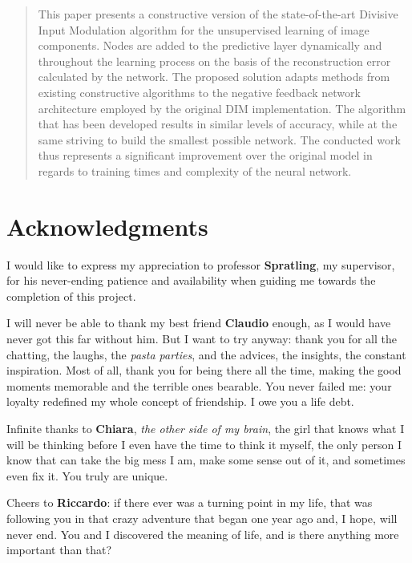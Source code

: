 \documentclass[11pt,a4paper]{report}
\begin{document}
	
	
	
	\begin{abstract}
		This paper presents a constructive version of the state-of-the-art Divisive Input Modulation algorithm for the unsupervised learning of image components. Nodes are added to the predictive layer dynamically and throughout the learning process on the basis of the reconstruction error calculated by the network. The proposed solution adapts methods from existing constructive algorithms to the negative feedback network architecture employed by the original DIM implementation. The algorithm that has been developed results in similar levels of accuracy, while at the same striving to build the smallest possible network. The conducted work thus represents a significant improvement over the original model in regards to training times and complexity of the neural network.
	\end{abstract}
	
	
	\chapter*{Acknowledgments}
		I would like to express my appreciation to professor \textbf{Spratling}, my supervisor, for his never-ending patience and availability when guiding me towards the completion of this project.
		
		I will never be able to thank my best friend \textbf{Claudio} enough, as I would have never got this far without him. But I want to try anyway: thank you for all the chatting, the laughs, the \emph{pasta parties}, and the advices, the insights, the constant inspiration. Most of all, thank you for being there all the time, making the good moments memorable and the terrible ones bearable. You never failed me: your loyalty redefined my whole concept of friendship. I owe you a life debt.
		
		Infinite thanks to \textbf{Chiara}, \emph{the other side of my brain}, the girl that knows what I will be thinking before I even have the time to think it myself, the only person I know that can take the big mess I am, make some sense out of it, and sometimes even fix it. You truly are unique.
		
		Cheers to \textbf{Riccardo}: if there ever was a turning point in my life, that was following you in that crazy adventure that began one year ago and, I hope, will never end. You and I discovered the meaning of life, and is there anything more important than that?
		
\end{document}
